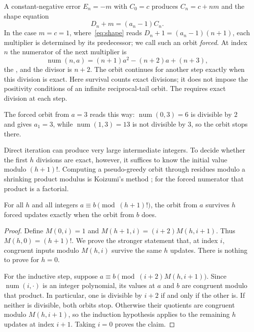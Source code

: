 \documentclass[11pt]{article}
\newcommand{\fnum}{\operatorname{num}}
\begin{document}
A constant-negative error $E_n=-m$ with $C_0=c$ produces $C_n=c+nm$ and the
shape equation
\begin{equation}\label{eq:shape}
 D_n+m=(a_n-1)C_n.
\end{equation}
In the case $m=c=1$, where~\eqref{eq:shape} reads $D_n+1=(a_n-1)(n+1)$, each
multiplier is determined by its predecessor; we call such an orbit
\emph{forced}.  At index $n$ the numerator of the next multiplier is
\[
 \fnum(n,a)=(n+1)a^{2}-(n+2)a+(n+3),
\]
the
, and the divisor is $n+2$.  The orbit continues for another step exactly when this division is
exact. Here survival counts exact divisions; it does not impose the
positivity conditions of an infinite reciprocal-tail orbit. The
requires exact division at each step.
\begin{example}\label{ex:shape}
The forced orbit from $a=3$ reads this way: $\fnum(0,3)=6$ is divisible by $2$
and gives $a_1=3$, while $\fnum(1,3)=13$ is not divisible by $3$, so the orbit
stops there.
\end{example}
Direct iteration can produce very large intermediate integers. To
decide whether the first $h$ divisions are exact, however, it suffices
to know the initial value modulo $(h+1)!$.
Computing a pseudo-greedy orbit through residues modulo a shrinking product
modulus is Koizumi's method \cite[Remark~2 and Algorithm~1,
pp.~13--14]{koizumi2025}; for the forced numerator that product is a
factorial.

\begin{theorem}\label{res:residue}
For all $h$ and all integers $a\equiv b \pmod{(h+1)!}$, the orbit from $a$
survives $h$ forced updates exactly when the orbit from $b$ does.
\end{theorem}

\begin{proof}
Define $M(0,i)=1$ and $M(h+1,i)=(i+2)M(h,i+1)$. Thus
$M(h,0)=(h+1)!$. We prove the stronger statement that, at index $i$,
congruent inputs modulo $M(h,i)$ survive the same $h$ updates.
There is nothing to prove for $h=0$.

For the inductive step, suppose
$a\equiv b\pmod{(i+2)M(h,i+1)}$. Since $\fnum(i,\cdot)$ is an integer
polynomial, its values at $a$ and $b$ are congruent modulo that product.
In particular, one is divisible by $i+2$ if and only if the other is.
If neither is divisible, both orbits stop. Otherwise their quotients
are congruent modulo $M(h,i+1)$, so the induction hypothesis applies
to the remaining $h$ updates at index $i+1$. Taking $i=0$ proves the claim.
\end{proof}
\end{document}
